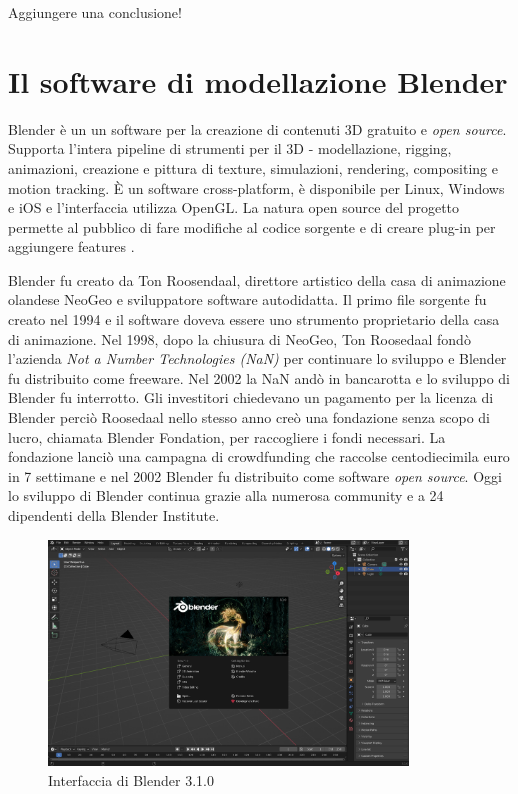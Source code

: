 Aggiungere una conclusione!

\section{Il software di modellazione Blender}

Blender è un un software per la creazione di contenuti 3D gratuito e \textit{open source}.
%
Supporta l'intera pipeline di strumenti per il 3D - modellazione, rigging, animazioni, creazione e pittura di texture, simulazioni, rendering, compositing e motion tracking.
%
È un software cross-platform, è disponibile per Linux, Windows e iOS e l'interfaccia utilizza OpenGL.
%
La natura open source del progetto permette al pubblico di fare modifiche al codice sorgente e di creare plug-in per aggiungere features \cite{BlenderAbout}.

Blender fu creato da Ton Roosendaal, direttore artistico della casa di animazione olandese NeoGeo e sviluppatore software autodidatta. 
%
Il primo file sorgente fu creato nel 1994 e il software doveva essere uno strumento proprietario della casa di animazione.
%
Nel 1998, dopo la chiusura di NeoGeo, Ton Roosedaal fondò l'azienda \textit{Not a Number Technologies (NaN)} per continuare lo sviluppo e Blender fu distribuito come freeware. 
%
Nel 2002 la NaN andò in bancarotta e lo sviluppo di Blender fu interrotto.
%
Gli investitori chiedevano un pagamento per la licenza di Blender perciò Roosedaal nello stesso anno creò una fondazione senza scopo di lucro, chiamata Blender Fondation, per raccogliere i fondi necessari.
%
La fondazione lanciò una campagna di crowdfunding che raccolse centodiecimila euro in 7 settimane e nel 2002 Blender fu distribuito come software \textit{open source}.
%
Oggi lo sviluppo di Blender continua grazie alla numerosa community e a 24 dipendenti della Blender Institute.

\begin{figure}[b]
    \centering
    \includegraphics[height=6cm]{figure/Blender_3.1.0_screenshot.png}
    \caption{Interfaccia di Blender 3.1.0}
\end{figure}

